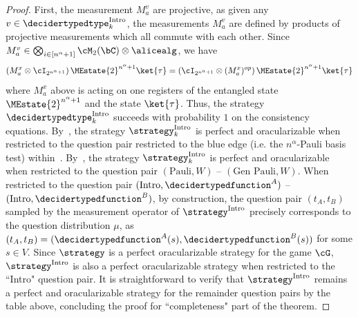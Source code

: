 \begin{proof}
	First, the measurement $M^v_a$ are projective, as given any $v \in \decidertypedtype^{\text{Intro}}_k$, the measurements $M^v_a$ are defined by products of projective measurements which all commute with each other. Since $M^v_a \in \bigotimes_{i \in [n^{\alpha}+1]} \cM_2(\bC) \otimes \alicealg$, we have
	\begin{equation*}
 		\left(M^x_a \otimes \cI_{2^{n^{\alpha} +1}} \right) \MEstate{2}^{n^{\alpha} +1} \ket{\tau} = 	\left(\cI_{2^{n^{\alpha} +1}} \otimes (M^x_a)^{op} \right) \MEstate{2}^{n^{\alpha} +1} \ket{\tau} 
	\end{equation*} 
	where $M^x_a$ above is acting on one registers of the entangled state $\MEstate{2}^{n^{\alpha} +1}$ and the state $\ket{\tau}$. Thus, the strategy $\decidertypedtype^{\text{Intro}}_k$ succeeds with probability $1$ on the consistency equations. By~, the strategy $\strategy^{\text{Intro}}_k$ is perfect and oracularizable when restricted to the question pair restricted to the blue edge (i.e. the $n^{\alpha}$-Pauli basis test) within~. By~, the strategy $\strategy^{\text{Intro}}_k$ is perfect and oracularizable when restricted to the question pair $(\text{Pauli}, W)$ -- $(\text{Gen Pauli}, W)$. When restricted to the question pair $(\text{Intro}, \decidertypedfunction^{A})$ -- $(\text{Intro}, \decidertypedfunction^{B})$, by construction, the question pair $(t_A,t_B)$ sampled by the measurement operator of $\strategy^{\text{Intro}}$ precisely corresponds to the question distribution $\mu$, as $(t_A,t_B) = (\decidertypedfunction^{A}(s), \decidertypedfunction^{B}(s))$ for some $s \in V$. Since $\strategy$ is a perfect oracularizable strategy for the game $\cG$, $\strategy^{\text{Intro}}$ is also a perfect oracularizable strategy when restricted to the ``Intro" question pair. It is straightforward to verify that $\strategy^{\text{Intro}}$ remains a perfect and oracularizable strategy for the remainder question pairs by the table above, concluding the proof for ``completeness" part of the theorem. 
	

\end{proof}
